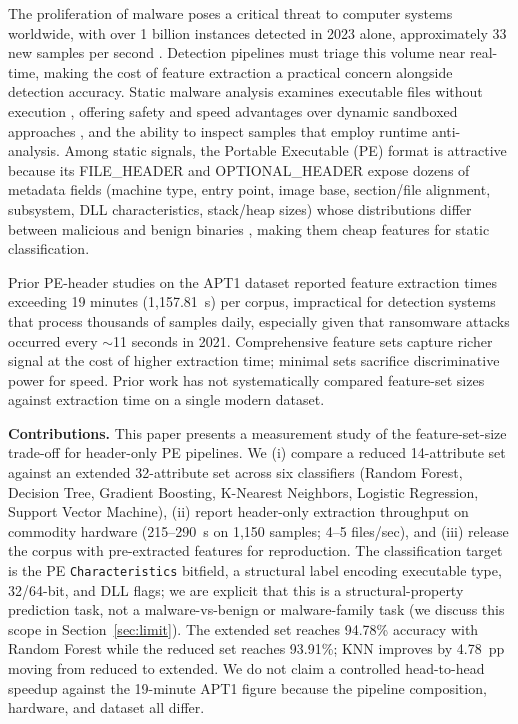 \documentclass[conference,a4paper]{IEEEtran}
\begin{document}
The proliferation of malware poses a critical threat to computer systems worldwide, with over 1 billion instances detected in 2023 alone, approximately 33 new samples per second \cite{kalakuntla2019cyber}. Detection pipelines must triage this volume near real-time, making the cost of feature extraction a practical concern alongside detection accuracy. Static malware analysis examines executable files without execution \cite{santos2021generating}, offering safety and speed advantages over dynamic sandboxed approaches \cite{black2016anti}, and the ability to inspect samples that employ runtime anti-analysis. Among static signals, the Portable Executable (PE) format \cite{rezaei2020efficient} is attractive because its FILE\_HEADER and OPTIONAL\_HEADER expose dozens of metadata fields (machine type, entry point, image base, section/file alignment, subsystem, DLL characteristics, stack/heap sizes) \cite{maleki2019improved} whose distributions differ between malicious and benign binaries \cite{alkhshali2020effect, yuk2022static}, making them cheap features for static classification.

Prior PE-header studies on the APT1 dataset \cite{balram2019static} reported feature extraction times exceeding 19 minutes (1{,}157.81~s) per corpus, impractical for detection systems that process thousands of samples daily, especially given that ransomware attacks occurred every $\sim$11 seconds in 2021. Comprehensive feature sets capture richer signal at the cost of higher extraction time; minimal sets sacrifice discriminative power for speed. Prior work has not systematically compared feature-set sizes against extraction time on a single modern dataset.

\textbf{Contributions.} This paper presents a measurement study of the feature-set-size trade-off for header-only PE pipelines. We (i) compare a reduced 14-attribute set against an extended 32-attribute set across six classifiers (Random Forest, Decision Tree, Gradient Boosting, K-Nearest Neighbors, Logistic Regression, Support Vector Machine), (ii) report header-only extraction throughput on commodity hardware (215--290~s on 1{,}150 samples; 4--5 files/sec), and (iii) release the corpus with pre-extracted features for reproduction. The classification target is the PE \texttt{Characteristics} bitfield, a structural label encoding executable type, 32/64-bit, and DLL flags; we are explicit that this is a structural-property prediction task, not a malware-vs-benign or malware-family task (we discuss this scope in Section~\ref{sec:limit}). The extended set reaches 94.78\% accuracy with Random Forest while the reduced set reaches 93.91\%; KNN improves by 4.78~pp moving from reduced to extended. We do not claim a controlled head-to-head speedup against the 19-minute APT1 figure because the pipeline composition, hardware, and dataset all differ.
\end{document}
